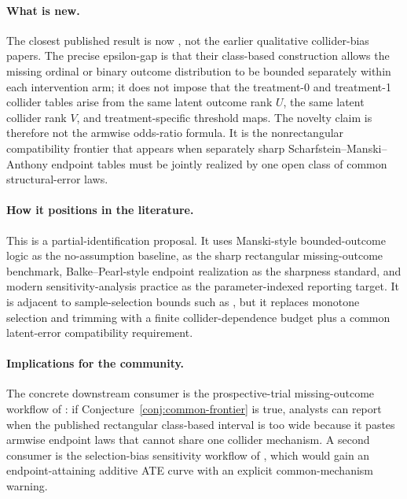 \documentclass[11pt]{article}
\theoremstyle{definition}
\theoremstyle{plain}
\theoremstyle{remark}
\begin{document}
\paragraph{What is new.}
The closest published result is now \citet{ScharfsteinManskiAnthony2004Bounds}, not the earlier qualitative collider-bias papers.  The precise epsilon-gap is that their class-based construction allows the missing ordinal or binary outcome distribution to be bounded separately within each intervention arm; it does not impose that the treatment-0 and treatment-1 collider tables arise from the same latent outcome rank \(U\), the same latent collider rank \(V\), and treatment-specific threshold maps.  The novelty claim is therefore not the armwise odds-ratio formula.  It is the nonrectangular compatibility frontier that appears when separately sharp Scharfstein--Manski--Anthony endpoint tables must be jointly realized by one open class of common structural-error laws.

\paragraph{How it positions in the literature.}
This is a partial-identification proposal.  It uses Manski-style bounded-outcome logic as the no-assumption baseline, \citet{ScharfsteinManskiAnthony2004Bounds} as the sharp rectangular missing-outcome benchmark, Balke--Pearl-style endpoint realization as the sharpness standard, and modern sensitivity-analysis practice as the parameter-indexed reporting target.  It is adjacent to sample-selection bounds such as \citet{Lee2009SampleSelection}, but it replaces monotone selection and trimming with a finite collider-dependence budget plus a common latent-error compatibility requirement.

\paragraph{Implications for the community.}
The concrete downstream consumer is the prospective-trial missing-outcome workflow of \citet{ScharfsteinManskiAnthony2004Bounds}: if Conjecture~\ref{conj:common-frontier} is true, analysts can report when the published rectangular class-based interval is too wide because it pastes armwise endpoint laws that cannot share one collider mechanism.  A second consumer is the selection-bias sensitivity workflow of \citet{SmithVanderWeele2019Selection}, which would gain an endpoint-attaining additive ATE curve with an explicit common-mechanism warning.
\end{document}
